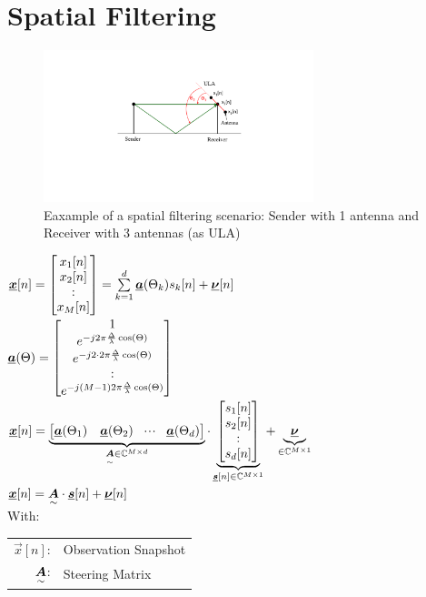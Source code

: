 \section{Spatial Filtering}
\begin{doublespace}
\begin{figure}[htbp]
	\centering
		\includegraphics[trim =6cm 7cm 6cm 4cm, clip,width=0.70\textwidth]{graphics/Spatial_filtering_antenna_example.pdf}
	\caption{Eaxample of a spatial filtering scenario: Sender with 1 antenna and Receiver with 3 antennas (as ULA)}
	\label{fig:SPatial_filtering_antenna_example}
\end{figure}
$\underline{\boldsymbol {x}}[n]=\begin{bmatrix} x_1[n]\\x_2[n]\\:\\x_M[n] \end{bmatrix}=\sum\limits_{k=1}^{d}\underline{\boldsymbol {a}}(\Theta_k)s_k[n]+\underline{\boldsymbol {\nu}}[n]$\\
$\underline{\boldsymbol {a}}(\Theta)=\begin{bmatrix} 1\\e^{-j2\pi \frac{\Delta}{\lambda} \cos(\Theta)}\\e^{-j 2 \cdot 2\pi \frac{\Delta}{\lambda} \cos(\Theta)}\\:\\e^{-j(M-1)2\pi \frac{\Delta}{\lambda} \cos(\Theta)} \end{bmatrix}$\\
$\underline{\boldsymbol {x}}[n]=\underbrace{\begin{bmatrix} \underline{\boldsymbol {a}}(\Theta_1)&\underline{\boldsymbol {a}}(\Theta_2)&\!\cdot \!\cdot\!\cdot\!&\underline{\boldsymbol {a}}(\Theta_d) \end{bmatrix}}_{\underset{\sim}{\boldsymbol {A}}\in\mathbb{C}^{M\times d}}\cdot\underbrace{\begin{bmatrix} s_1[n]\\s_2[n]\\:\\s_d[n] \end{bmatrix}}_{\underline{\boldsymbol {s}}[n]\in\mathbb{C}^{M\times 1}}+\underbrace{\underline{\boldsymbol {\nu}}}_{\in\mathbb{C}^{M\times 1}}$\\
$\underline{\boldsymbol {x}}[n]=\underset{\sim}{\boldsymbol {A}}\cdot \underline{\boldsymbol {s}}[n]+\underline{\boldsymbol {\nu}}[n]$\\
With:\\
\begin{tabular}{rl}
$\vec{x}[n]$: & Observation Snapshot\\
$\underset{\sim}{\boldsymbol {A}}$: & Steering Matrix\\

\end{tabular}
\end{doublespace}
